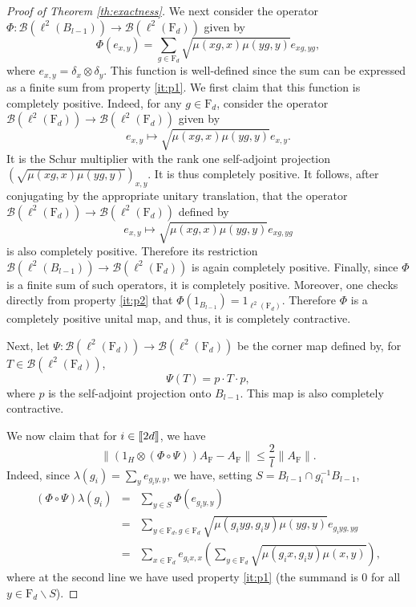 \documentclass[11pt]{article}
\renewcommand{\star}{{\mathrm{F}}}
\newcommand{\dF}{\mathrm{F}}
\newcommand{\cB}{\mathcal{B}}
\newcommand{\PAR}[1]{{{\left(#1\right)}}} %
\newcommand{\1}{1\!\!{\sf I}}
\newcommand{\INT}[1]{{{\left[\hspace{-1.4pt}\left[#1\right]\hspace{-1.4pt}\right]}}}
\begin{document}
\begin{proof}[Proof of Theorem \ref{th:exactness}]
We next consider the operator
$\Phi : \cB(\ell^2(B_{l-1}))\to \cB(\ell^2(\dF_d))$ given by 
$$\Phi (e_{x,y})=\sum_{ g \in \dF_d}\sqrt{\mu ( x g ,x )\mu (y g,y)}e_{x g , y g},$$ 
where $e_{x,y} = \delta_{x} \otimes \delta_y$. This function is well-defined since the sum can be expressed as a finite sum from property \eqref{it:p1}. We first claim that this function is completely positive. Indeed, for any $g\in \dF_d$, consider the operator $\cB(\ell^2(\dF_d))\to \cB(\ell^2(\dF_d))$ given 
by 
$$e_{x,y} \mapsto \sqrt{\mu (x g ,x)\mu (y g, y )}  e_{x,y}.$$
It is the Schur multiplier with the rank one self-adjoint projection $(\sqrt{\mu (xg,x)\mu (yg,y)})_{x,y}$.  It is thus completely positive. 
It follows, after conjugating by the appropriate unitary translation, that
 the operator 
$\cB(\ell^2(\dF_d))\to \cB(\ell^2(\dF_d))$ defined by 
$$e_{x,y} \mapsto \sqrt{\mu ( xg,x)\mu (yg,y)}e_{x g ,y g}$$
is also completely positive. 
Therefore its restriction  $\cB(\ell^2(B_{l-1})) \to \cB(\ell^2(\dF_d))$ is again completely positive. Finally, since $\Phi$ is a finite sum of such operators, it is completely positive.
Moreover, one checks directly from property \eqref{it:p2} that $\Phi (1_{B_{l-1}})= 1_{\ell^2(\dF_d)}$. Therefore $\Phi$ is a completely positive unital map, and thus, it is completely contractive. 

Next, let $\Psi: \cB(\ell^2(\dF_d)) \to \cB(\ell^2(\dF_d))$ be the corner map defined by, for $T \in \cB(\ell^2(\dF_d)) $,
$$\Psi ( T ) =  p  \cdot T \cdot p,$$ where $p$ is the self-adjoint projection onto $B_{l-1}$. This map is also completely contractive.

We now claim that for $ i \in \INT{2d}$, we have
\begin{equation}\label{eq:clm2}
\| ( 1_H\otimes (\Phi\circ \Psi ) ) A_\star -A_\star \|\le  \frac{2}{l}\|A_\star\|.
\end{equation}
Indeed, since $\lambda(g_i) = \sum_y e_{g_i y , y}$, we have, setting $S = B_{l-1} \cap g_i^{-1} B_{l-1}$,
\begin{eqnarray*}
(\Phi \circ \Psi )\lambda (g_i)  & = & \sum_{y \in S} \Phi ( e_{g_i y,y} )  \nonumber\\
& = & \sum_{y \in \dF_d,g \in \dF_d} \sqrt{\mu(g_i y g , g_i y  )\mu(y g ,  y) } e_{g_i y g  , y g} \nonumber\\ 
& = & \sum_{x \in \dF_d} e_{g_i x ,x} \PAR{ \sum_{y \in \dF_d}\sqrt{\mu(g_i x  , g_i y)\mu(x  ,  y )} }, \label{eq:clm200} 
\end{eqnarray*}
where at the second line we have used property \eqref{it:p1} (the summand is $0$ for all $y \in \dF_d \backslash S$). 


\end{proof}
\end{document}
